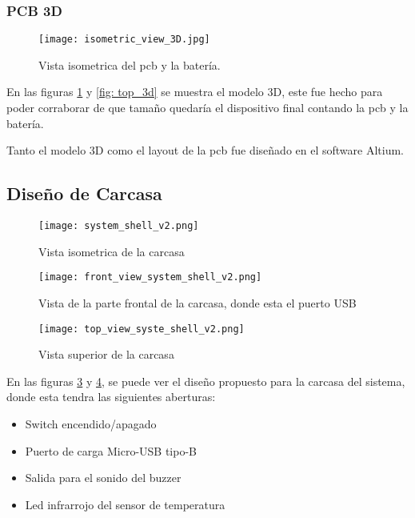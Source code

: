 \subsubsection{PCB 3D}
\begin{figure}[htp!]
    \centering
    \texttt{[image: isometric\_view\_3D.jpg]}
    \caption{Vista isometrica del \acrshort{pcb} y la batería.}
    \label{fig: isometric_3d}
\end{figure}
\FloatBarrier

En las figuras \ref{fig: isometric_3d} y \ref{fig: top_3d} se muestra el modelo 3D, este fue hecho
para poder corraborar de que tamaño quedaría el dispositivo final contando la \acrshort{pcb} y la batería.

Tanto el modelo 3D como el layout de la \acrshort{pcb} fue diseñado en el software Altium.
\subsection{Diseño de Carcasa}
\begin{figure}[htp!]
    \centering
    \texttt{[image: system\_shell\_v2.png]}
    \caption{Vista isometrica de la carcasa}
    \label{fig: isometric_view_shell}
\end{figure}
\FloatBarrier

\begin{figure}[htp!]
    \centering
    \texttt{[image: front\_view\_system\_shell\_v2.png]}
    \caption{Vista de la parte frontal de la carcasa, donde esta el puerto USB}
    \label{fig: front_view_shell}
\end{figure}
\FloatBarrier

\begin{figure}[htp!]
    \centering
    \texttt{[image: top\_view\_syste\_shell\_v2.png]}
    \caption{Vista superior de la carcasa}
    \label{fig: top_view_shell}
\end{figure}
\FloatBarrier


En las figuras \ref{fig: front_view_shell} y \ref{fig: top_view_shell}, 
se puede ver el diseño propuesto para la carcasa del sistema, donde esta 
tendra las siguientes aberturas:

\begin{itemize}
    \item Switch encendido/apagado
    \item Puerto de carga Micro-USB tipo-B
    \item Salida para el sonido del buzzer
    \item Led infrarrojo del sensor de temperatura
\end{itemize}

